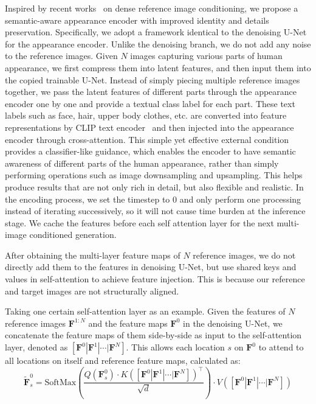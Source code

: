 Inspired by recent works~\cite{referenceonlycontrol,cao2023masactrl,xu2023magicanimate,hu2023animateanyone} on dense reference image conditioning, we propose a semantic-aware appearance encoder with improved identity and details preservation. Specifically, we adopt a framework identical to the denoising U-Net for the appearance encoder. Unlike the denoising branch, we do not add any noise to the reference images. Given $N$ images capturing various parts of human appearance, we first compress them into latent features, and then input them into the copied trainable U-Net. Instead of simply piecing multiple reference images together, we pass the latent features of different parts through the appearance encoder one by one and provide a textual class label for each part. These text labels such as face, hair, upper body clothes, etc. are converted into feature representations by CLIP text encoder~\cite{radford2021clip} and then injected into the appearance encoder through cross-attention. This simple yet effective external condition provides a classifier-like guidance, which enables the encoder to have semantic awareness of different parts of the human appearance, rather than simply performing operations such as image downsampling and upsampling. This helps produce results that are not only rich in detail, but also flexible and realistic. In the encoding process, we set the timestep to 0 and only perform one processing instead of iterating successively, so it will not cause time burden at the inference stage. We cache the features before each self attention layer for the next multi-image conditioned generation.

 After obtaining the multi-layer feature maps of $N$ reference images, we do not directly add them to the features in denoising U-Net, but use shared keys and values in self-attention to achieve feature injection. This is because our reference and target images are not structurally aligned.

Taking one certain self-attention layer as an example. Given the features of $N$ reference images $\bm{F}^{1:N}$ and the feature maps $\bm{F}^{0}$ in the denoising U-Net, we concatenate the feature maps of them side-by-side as input to the self-attention layer, denoted as $[\bm{F}^{0}|\bm{F}^{1}|\cdots|\bm{F}^{N}]$. This allows each location $s$ on $\bm{F}^{0}$ to attend to all locations on itself and reference feature maps, calculated as:
\begin{equation}
    \tilde{\bm{F}}_{s}^{0} = \text{SoftMax}\left(
    \frac{
    Q(\bm{F}_s^0)\cdot K([\bm{F}^{0}|\bm{F}^{1}|\cdots|\bm{F}^{N}])^{\top}
    }{
    \sqrt{d}
    }\right)\cdot V([\bm{F}^{0}|\bm{F}^{1}|\cdots|\bm{F}^{N}])
    \label{eq:vanilla_self_attn}
\end{equation}


